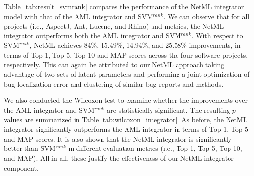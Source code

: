 
Table~\ref{tab:result_svmrank} compares the performance of the NetML integrator model with that of the AML integrator and SVM$^{rank}$. We can observe that for all projects (i.e., AspectJ, Ant, Lucene, and Rhino) and metrics, the NetML integrator outperforms both the AML integrator and SVM$^{rank}$. With respect to SVM$^{rank}$, NetML achieves 84\%, 15.49\%, 14.94\%, and 25.58\% improvements, in terms of Top 1, Top 5, Top 10 and MAP scores across the four software projects, respectively. This can again be attributed to our NetML approach taking advantage of two sets of latent parameters and performing a joint optimization of bug localization error and clustering of similar bug reports and methods.

We also conducted the Wilcoxon test to examine whether the improvements over the AML integrator and SVM$^{rank}$ are statistically significant. The resulting $p$-values are summarized in Table \ref{tab:wilcoxon_integrator}. As before, the NetML integrator significantly outperforms the AML integrator in terms of Top 1, Top 5 and MAP scores. It is also shown that the NetML integrator is significantly better than SVM$^{rank}$ in different evaluation metrics (i.e., Top 1, Top 5, Top 10, and MAP). All in all, these justify the effectiveness of our NetML integrator component.




